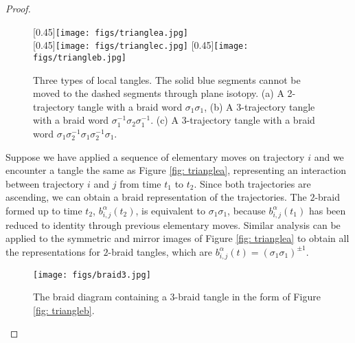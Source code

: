 \documentclass[conference]{IEEEtran}
\newcommand*{\projang}{\alpha} %
\newcommand*{\bgen}{\sigma} %
\newcommand*{\word}{b} %
\begin{document}
\begin{proof}
\begin{figure}
	\centering
    \subcaptionbox{ \footnotesize \label{fig: trianglea}}[0.45\linewidth]{\texttt{[image: figs/trianglea.jpg]}}\\
    \subcaptionbox{\footnotesize \label{fig: triangleb}}[0.45\linewidth]{\texttt{[image: figs/trianglec.jpg]}}
    \subcaptionbox{\footnotesize \label{fig: trianglec}}[0.45\linewidth]{\texttt{[image: figs/triangleb.jpg]}}    
	\caption{\footnotesize Three types of local tangles. The solid blue segments cannot be moved to the dashed segments through plane isotopy. (a) A 2-trajectory tangle with a braid word $\bgen_1\bgen_1$, (b) A 3-trajectory tangle with a braid word  $\bgen_1^{-1}\bgen_2\bgen_1^{-1}$. (c) A 3-trajectory tangle with a braid word $\bgen_1\bgen_2^{-1}\bgen_1\bgen_2^{-1}\bgen_1$.
    }  \label{fig: tangles}
\end{figure}
    Suppose we have applied a sequence of elementary moves on trajectory $i$ and we encounter a tangle the same as Figure \ref{fig: trianglea}, representing an interaction between trajectory $i$ and $j$ from time $t_1$ to $t_2$. 
    Since both trajectories are ascending, we can obtain a braid representation of the trajectories.
    The $2$-braid formed up to time $t_2$, $\word^\projang_{i,j}(t_2)$, is equivalent to $\bgen_1\bgen_1$, because $\word^\projang_{i,j}(t_1)$ has been reduced to identity through previous elementary moves. 
    Similar analysis can be applied to the symmetric and mirror images of Figure \ref{fig: trianglea} to obtain all the representations for $2$-braid tangles, which are $\word^\projang_{i,j}(t)=(\bgen_1\bgen_1)^{\pm 1}$.
\begin{figure}[!t]
\centering
\texttt{[image: figs/braid3.jpg]}
\caption{\footnotesize The braid diagram containing a $3$-braid tangle in the form of Figure \ref{fig: triangleb}.}
\label{fig: braid3}
\end{figure}


\end{proof}
\end{document}

